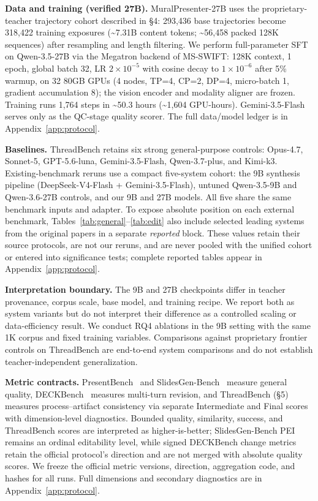 \textbf{Data and training (verified 27B).} MuralPresenter-27B uses the proprietary-teacher trajectory cohort described in §4: 293{,}436 base trajectories become 318{,}422 training exposures (\textasciitilde7.31B content tokens; \textasciitilde56{,}458 packed 128K sequences) after resampling and length filtering. We perform full-parameter SFT on Qwen-3.5-27B via the Megatron backend of MS-SWIFT: 128K context, 1 epoch, global batch 32, LR \(2\times10^{-5}\) with cosine decay to \(1\times10^{-6}\) after 5\% warmup, on 32 80GB GPUs (4 nodes, TP=4, CP=2, DP=4, micro-batch 1, gradient accumulation 8); the vision encoder and modality aligner are frozen. Training runs 1{,}764 steps in \textasciitilde50.3 hours (\textasciitilde1{,}604 GPU-hours). Gemini-3.5-Flash serves only as the QC-stage quality scorer. The full data/model ledger is in Appendix~\ref{app:protocol}.

\textbf{Baselines.} ThreadBench retains six strong general-purpose controls: Opus-4.7, Sonnet-5, GPT-5.6-luna, Gemini-3.5-Flash, Qwen-3.7-plus, and Kimi-k3. Existing-benchmark reruns use a compact five-system cohort: the 9B synthesis pipeline (DeepSeek-V4-Flash + Gemini-3.5-Flash), untuned Qwen-3.5-9B and Qwen-3.6-27B controls, and our 9B and 27B models. All five share the same benchmark inputs and adapter. To expose absolute position on each external benchmark, Tables~\ref{tab:general}--\ref{tab:edit} also include selected leading systems from the original papers in a separate \emph{reported} block. These values retain their source protocols, are not our reruns, and are never pooled with the unified cohort or entered into significance tests; complete reported tables appear in Appendix~\ref{app:protocol}.

\textbf{Interpretation boundary.} The 9B and 27B checkpoints differ in teacher provenance, corpus scale, base model, and training recipe. We report both as system variants but do not interpret their difference as a controlled scaling or data-efficiency result. We conduct RQ4 ablations in the 9B setting with the same 1K corpus and fixed training variables. Comparisons against proprietary frontier controls on ThreadBench are end-to-end system comparisons and do not establish teacher-independent generalization.

\textbf{Metric contracts.} PresentBench~\citep{chen2026presentbench} and SlidesGen-Bench~\citep{yang2026slidesgenbench} measure general quality, DECKBench~\citep{jang2026deckbench} measures multi-turn revision, and ThreadBench (§5) measures process–artifact consistency via separate Intermediate and Final scores with dimension-level diagnostics. Bounded quality, similarity, success, and ThreadBench scores are interpreted as higher-is-better; SlidesGen-Bench PEI remains an ordinal editability level, while signed DECKBench change metrics retain the official protocol's direction and are not merged with absolute quality scores. We freeze the official metric versions, direction, aggregation code, and hashes for all runs. Full dimensions and secondary diagnostics are in Appendix~\ref{app:protocol}.

